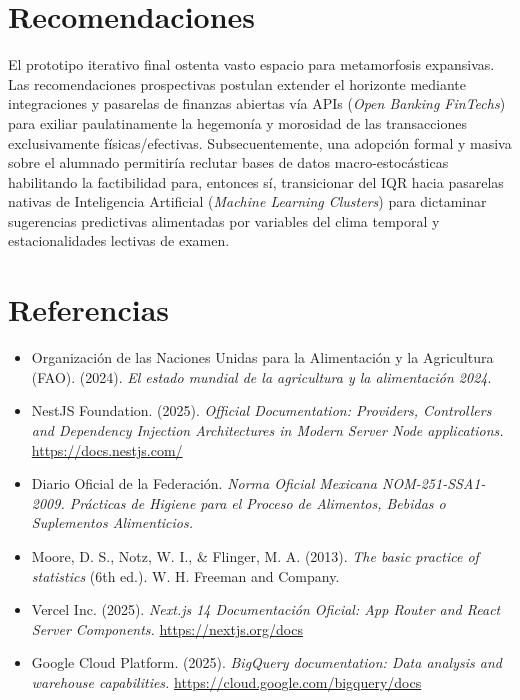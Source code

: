 \documentclass[12pt, a4paper]{article}
\begin{document}
\section{Recomendaciones}
El prototipo iterativo final ostenta vasto espacio para metamorfosis expansivas. Las recomendaciones prospectivas postulan extender el horizonte mediante integraciones y pasarelas de finanzas abiertas vía APIs (\textit{Open Banking FinTechs}) para exiliar paulatinamente la hegemonía y morosidad de las transacciones exclusivamente físicas/efectivas. Subsecuentemente, una adopción formal y masiva sobre el alumnado permitiría reclutar bases de datos macro-estocásticas habilitando la factibilidad para, entonces sí, transicionar del IQR hacia pasarelas nativas de Inteligencia Artificial (\textit{Machine Learning Clusters}) para dictaminar sugerencias predictivas alimentadas por variables del clima temporal y estacionalidades lectivas de examen.

\section{Referencias}
\begin{itemize}
    \item Organización de las Naciones Unidas para la Alimentación y la Agricultura (FAO). (2024). \textit{El estado mundial de la agricultura y la alimentación 2024}.
    \item NestJS Foundation. (2025). \textit{Official Documentation: Providers, Controllers and Dependency Injection Architectures in Modern Server Node applications.} \url{https://docs.nestjs.com/}
    \item Diario Oficial de la Federación. \textit{Norma Oficial Mexicana NOM-251-SSA1-2009. Prácticas de Higiene para el Proceso de Alimentos, Bebidas o Suplementos Alimenticios.} 
    \item Moore, D. S., Notz, W. I., \& Flinger, M. A. (2013). \textit{The basic practice of statistics} (6th ed.). W. H. Freeman and Company.
    \item Vercel Inc. (2025). \textit{Next.js 14 Documentación Oficial: App Router and React Server Components.} \url{https://nextjs.org/docs}
    \item Google Cloud Platform. (2025). \textit{BigQuery documentation: Data analysis and warehouse capabilities.} \url{https://cloud.google.com/bigquery/docs}
\end{itemize}
\end{document}
